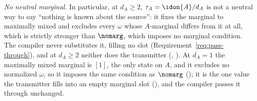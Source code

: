 \begin{remark}
\emph{No neutral marginal.} In particular, at $d_A\ge2$,
$\tau_A=\idon{A}/d_A$ is not a neutral way to say ``nothing is known about
the source'': it fixes the marginal to maximally mixed and excludes every
$\omega$ whose $A$-marginal differs from it at all, which is strictly
stronger than $\nomarg$, which imposes no marginal condition. The compiler
never substitutes it, filling no slot (Requirement~\ref{req:pass-through}),
and at $d_A\ge2$ neither does the transmitter (,
). At $d_A=1$ the maximally mixed
marginal is $[1]$, the only state on $A$, and it excludes no normalized
$\omega$, so it imposes the same condition as $\nomarg$
(); it is the one value the transmitter fills into
an empty marginal slot (), and the
compiler passes it through unchanged.
\end{remark}
